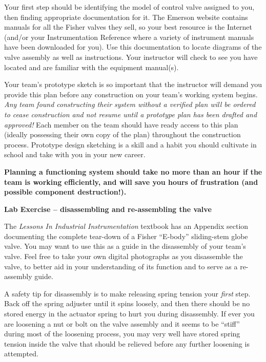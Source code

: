\vskip 10pt

Your first step should be identifying the model of control valve assigned to you, then finding appropriate documentation for it.  The Emerson website contains manuals for all the Fisher valves they sell, so your best resource is the Internet (and/or your Instrumentation Reference where a variety of instrument manuals have been downloaded for you).  Use this documentation to locate diagrams of the valve assembly as well as instructions.  Your instructor will check to see you have located and are familiar with the equipment manual(s).

\vskip 10pt

Your team's prototype sketch is so important that the instructor will demand you provide this plan before any construction on your team's working system begins.  {\it Any team found constructing their system without a verified plan will be ordered to cease construction and not resume until a prototype plan has been drafted and approved!}  Each member on the team should have ready access to this plan (ideally possessing their own copy of the plan) throughout the construction process.  Prototype design sketching is a skill and a habit you should cultivate in school and take with you in your new career.

\vskip 10pt

{\bf Planning a functioning system should take no more than an hour if the team is working efficiently, and will save you hours of frustration (and possible component destruction!).}





\vfil \eject

\noindent
{\bf Lab Exercise -- disassembling and re-assembling the valve}

\vskip 5pt

The {\it Lessons In Industrial Instrumentation} textbook has an Appendix section documenting the complete tear-down of a Fisher ``E-body'' sliding-stem globe valve.  You may want to use this as a guide in the disassembly of your team's valve.  Feel free to take your own digital photographs as you disassemble the valve, to better aid in your understanding of its function and to serve as a re-assembly guide.

A safety tip for disassembly is to make releasing spring tension your {\it first} step.  Back off the spring adjuster until it spins loosely, and then there should be no stored energy in the actuator spring to hurt you during disassembly.  If ever you are loosening a nut or bolt on the valve assembly and it seems to be ``stiff'' during most of the loosening process, you may very well have stored spring tension inside the valve that should be relieved before any further loosening is attempted.

